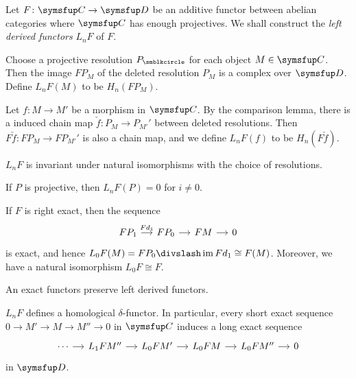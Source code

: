 \begin{definition}
  Let $F\colon \CAT{C}\to \CAT{D}$ be an additive functor between abelian categories where $\CAT{C}$ has enough projectives. We shall construct the \emph{left derived functors} $L_nF$ of $F$.

  Choose a projective resolution $P_\CCCIR$ for each object $M\in\CAT{C}$. Then the image $FP_M$ of the deleted resolution $P_M$ is a complex over $\CAT{D}$. Define $L_nF(M)$ to be $H_n(FP_M)$.

  Let $f\colon M\to M'$ be a morphism in $\CAT{C}$. By the comparison lemma, there is a induced chain map $\check f\colon P_M\to P_{M'}'$ between deleted resolutions. Then $F\check f\colon FP_M\to FP_{M'}'$ is also a chain map, and we define $L_nF(f)$ to be $H_n(F\check f)$.
\end{definition}

\begin{remark}
  $L_nF$ is invariant under natural isomorphisms with the choice of resolutions.
\end{remark}

\begin{remark}
  If $P$ is projective, then $L_nF(P)=0$ for $i\neq 0$.
\end{remark}

\begin{remark}
  If $F$ is right exact, then the sequence
  \begin{equation*}
    \begin{tikzcd}[sep=small]
      FP_1 & FP_0 & FM & 0
      \arrow[from=1-1,]{1-2}[]{Fd_1}
      \arrow[from=1-2,]{1-3}[]{}
      \arrow[from=1-3,]{1-4}[]{}
    \end{tikzcd}
  \end{equation*}
  is exact, and hence $L_0F(M)=FP_0\DIV\IM Fd_1 \cong F(M)$. Moreover, we have a natural isomorphism $L_0F\cong F$.
\end{remark}

\begin{proposition}
  An exact functors preserve left derived functors.
\end{proposition}

\begin{proposition}
  $L_nF$ defines a homological $\delta$-functor. In particular, every short exact sequence $0\to M'\to M\to M''\to 0$ in $\CAT{C}$ induces a long exact sequence
  \begin{equation*}
    \begin{tikzcd}[sep=small]
      \dotsb & L_1FM'' & L_0FM' & L_0FM & L_0FM'' & 0
      \arrow[from=1-1,]{1-2}[]{}
      \arrow[from=1-2,]{1-3}[]{}
      \arrow[from=1-3,]{1-4}[]{}
      \arrow[from=1-4,]{1-5}[]{}
      \arrow[from=1-5,]{1-6}[]{}
    \end{tikzcd}
  \end{equation*}
  in $\CAT{D}$.
\end{proposition}

